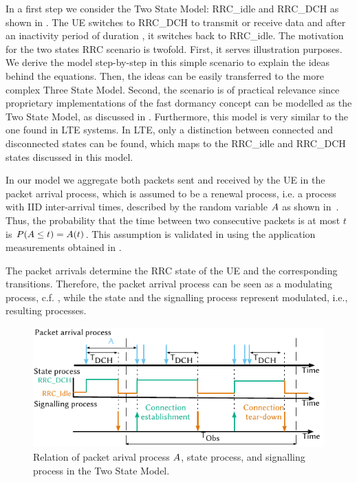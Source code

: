 In a first step we consider the Two State Model: \gls{RRC_idle} and \gls{RRC_DCH} as shown in .
The \gls{UE} switches to \gls{RRC_DCH} to transmit or receive data and after an inactivity period of duration \TDCH, it switches back to \gls{RRC_idle}.
The motivation for the two states \gls{RRC} scenario is twofold.
First, it serves illustration purposes.
We derive the model step-by-step in this simple scenario to explain the ideas behind the equations.
Then, the ideas can be easily transferred to the more complex Three State Model.
Second, the scenario is of practical relevance since proprietary implementations of the fast dormancy concept can be modelled as the Two State Model, as discussed in .
Furthermore, this model is very similar to the one found in \gls{LTE} systems.
In \gls{LTE}, only a distinction between connected and disconnected states can be found, which maps to the \gls{RRC_idle} and \gls{RRC_DCH} states discussed in this model.

In our model we aggregate both packets sent and received by the \gls{UE} in the packet arrival process, which is assumed to be a renewal process, i.e. a process  with \gls{IID} inter-arrival times, described by the random variable \(A\) as shown in~.
Thus, the probability that the time between two consecutive packets is at most \(t\) is \(P(A \leq t) = A(t)\).
This assumption is validated in  using the application measurements obtained in .

The packet arrivals determine the \gls{RRC} state of the \gls{UE} and the corresponding transitions. Therefore, the packet arrival process can be seen as a modulating process, c.f. \cite{TranGia1983,TranGia1988}, while the state and the signalling process represent modulated, i.e., resulting processes.

\begin{figure}
  \centering
  \includegraphics{network/performance_model/analytical_model/figures/arrival_process}
  \caption{Relation of packet arival process \(A\), state process, and signalling process in the Two State Model.}
  \label{fig:network:performance_model:system_description:arrival_process}
\end{figure}

